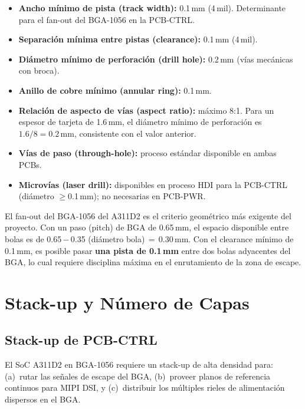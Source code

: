 \begin{fabbox}
  \begin{itemize}
    \item \textbf{Ancho mínimo de pista (track width):} 0.1\,mm (4\,mil).
      Determinante para el fan-out del BGA-1056 en la PCB-CTRL.
    \item \textbf{Separación mínima entre pistas (clearance):} 0.1\,mm (4\,mil).
    \item \textbf{Diámetro mínimo de perforación (drill hole):} 0.2\,mm
      (vías mecánicas con broca).
    \item \textbf{Anillo de cobre mínimo (annular ring):} 0.1\,mm.
    \item \textbf{Relación de aspecto de vías (aspect ratio):} máximo 8:1.
      Para un espesor de tarjeta de 1.6\,mm, el diámetro mínimo de perforación
      es $1.6/8 = 0.2$\,mm, consistente con el valor anterior.
    \item \textbf{Vías de paso (through-hole):} proceso estándar disponible en
      ambas PCBs.
    \item \textbf{Microvías (laser drill):} disponibles en proceso HDI para
      la PCB-CTRL (diámetro $\geq$0.1\,mm); no necesarias en PCB-PWR.
  \end{itemize}
\end{fabbox}

\begin{infobox}
  El fan-out del BGA-1056 del A311D2 es el criterio geométrico más exigente del
  proyecto. Con un paso (pitch) de BGA de 0.65\,mm, el espacio disponible entre
  bolas es de 0.65\,$-$\,0.35 (diámetro bola)\,$=$\,0.30\,mm. Con el clearance
  mínimo de 0.1\,mm, es posible pasar \textbf{una pista de 0.1\,mm} entre dos
  bolas adyacentes del BGA, lo cual requiere disciplina máxima en el enrutamiento
  de la zona de escape.
\end{infobox}

\section{Stack-up y Número de Capas}
\label{sec:fab_stackup}

\subsection{Stack-up de PCB-CTRL}

El SoC A311D2 en BGA-1056 requiere un stack-up de alta densidad para:
(a)~rutar las señales de escape del BGA, (b)~proveer planos de referencia continuos
para MIPI DSI, y (c)~distribuir los múltiples rieles de alimentación dispersos en
el BGA.

